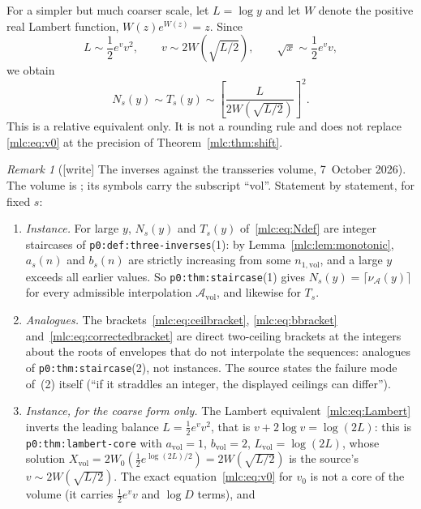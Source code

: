 \documentclass[11pt]{article}
\theoremstyle{remark}\newtheorem{remark}[theorem]{Remark}
\newcommand{\file}[1]{\nolinkurl{#1}}
\begin{document}
For a simpler but much coarser scale, let $L=\log y$ and let $W$ denote the positive real Lambert function, $W(z)e^{W(z)}=z$. Since
\[
 L\sim\frac12e^vv^2,\qquad
 v\sim2W(\sqrt{L/2}),\qquad \sqrt x\sim\frac12e^vv,
\]
we obtain
\begin{equation}\label{mlc:eq:Lambert}
 N_s(y)\sim T_s(y)\sim
           \left[\frac{L}{2W(\sqrt{L/2})}\right]^2.
\end{equation}
This is a relative equivalent only. It is not a rounding rule and does not replace \eqref{mlc:eq:v0} at the precision of Theorem~\ref{mlc:thm:shift}.

\begin{remark}[{[write]} The inverses against the transseries volume, 7~October 2026]\label{mlc:rem:transseries}
The volume is
;
its symbols carry the subscript ``vol''. Statement by statement, for fixed
$s$:
\begin{enumerate}[label=(\alph*)]
\item \emph{Instance.} For large $y$, $N_s(y)$ and $T_s(y)$
 of~\eqref{mlc:eq:Ndef} are integer staircases of
 \file{p0:def:three-inverses}(1): by Lemma~\ref{mlc:lem:monotonic}, $a_s(n)$
 and $b_s(n)$ are strictly increasing from some $n_{1,\mathrm{vol}}$, and a
 large $y$ exceeds all earlier values. So \file{p0:thm:staircase}(1) gives
 $N_s(y)=\lceil\nu_{\mathcal A}(y)\rceil$ for every admissible interpolation
 $\mathcal A_{\mathrm{vol}}$, and likewise for $T_s$.
\item \emph{Analogues.} The brackets~\eqref{mlc:eq:ceilbracket},
 \eqref{mlc:eq:bbracket} and~\eqref{mlc:eq:correctedbracket} are direct
 two-ceiling brackets at the integers about the roots of envelopes that do
 not interpolate the sequences: analogues of \file{p0:thm:staircase}(2), not
 instances. The source states the failure mode of~(2) itself (``if it
 straddles an integer, the displayed ceilings can differ'').
\item \emph{Instance, for the coarse form only.} The Lambert
 equivalent~\eqref{mlc:eq:Lambert} inverts the leading balance
 $L=\tfrac12e^vv^2$, that is $v+2\log v=\log(2L)$: this is
 \file{p0:thm:lambert-core} with $a_{\mathrm{vol}}=1$, $b_{\mathrm{vol}}=2$,
 $L_{\mathrm{vol}}=\log(2L)$, whose solution
 $X_{\mathrm{vol}}=2W_0(\tfrac12e^{\log(2L)/2})=2W(\sqrt{L/2})$ is the source's
 $v\sim2W(\sqrt{L/2})$. The exact equation~\eqref{mlc:eq:v0} for $v_0$ is not a
 core of the volume (it carries $\tfrac12e^vv$ and $\log D$ terms), and

\end{enumerate}
\end{remark}
\end{document}

